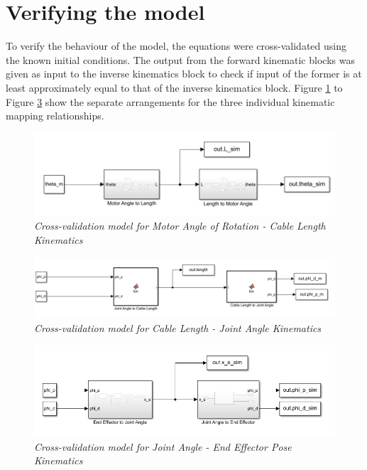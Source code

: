 \documentclass[a4paper,12pt]{report}
\begin{document}
\section{Verifying the model}
To verify the behaviour of the model, the equations were cross-validated using the known initial conditions. The output from the forward kinematic blocks was given as input to the inverse kinematics block to check if input of the former is at least approximately equal to that of the inverse kinematics block.
Figure \ref{motor_verify} to Figure \ref{end_verify} show the separate arrangements for the three individual kinematic mapping relationships.
\begin{figure}[H]
	\centering
	\includegraphics[width=\textwidth]{images/length_to_motor_angle_verify.png}
	\caption{\textit{Cross-validation model for Motor Angle of Rotation - Cable Length Kinematics }}
		\label{motor_verify}
	\end{figure}
\begin{figure}[H]
	\centering
	\includegraphics[width=\textwidth]{images/cable_to_angle_verify.png}
	\caption{\textit{Cross-validation model for Cable Length - Joint Angle Kinematics}}
		\label{length_verify}
	\end{figure}
\begin{figure}[H]
	\centering
	\includegraphics[width=\textwidth]{images/joint_to_end_verify.png}
	\caption{\textit{Cross-validation model for Joint Angle - End Effector Pose Kinematics }}
		\label{end_verify}
	\end{figure}
\end{document}
